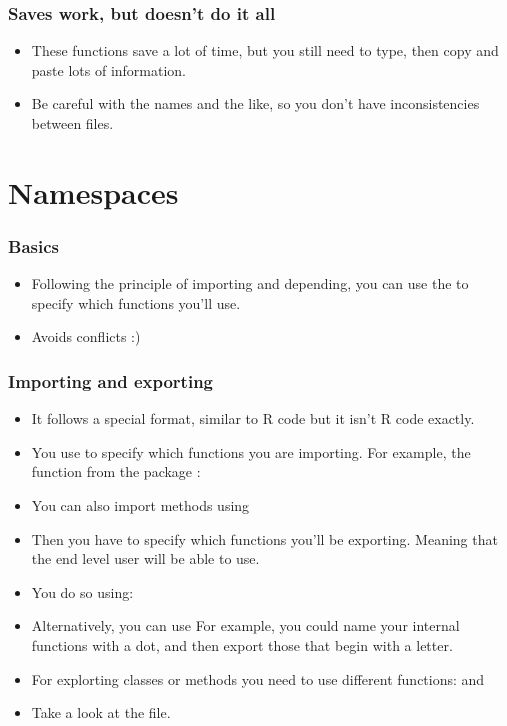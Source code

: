 \begin{frame}[allowframebreaks]
  \frametitle{Saves work, but doesn't do it all}
  \begin{itemize}
  \item These functions save a lot of time, but you still need to type, then copy and paste lots of information.
  \item Be careful with the names and the like, so you don't have inconsistencies between files.
  \end{itemize}
\end{frame}

\section{Namespaces}

\begin{frame}[allowframebreaks]
  \frametitle{Basics}
  \begin{itemize}
  \item Following the principle of importing and depending, you can use the  to specify which functions you'll use.
  \item Avoids conflicts :)
  \end{itemize}
\end{frame}

\begin{frame}[allowframebreaks]
  \frametitle{Importing and exporting}
  \begin{itemize}
  \item It follows a special format, similar to R code but it isn't R code exactly.
  \item You use  to specify which functions you are importing. For example, the function  from the package : \\ 
  \item You can also import methods using 
  \item Then you have to specify which functions you'll be exporting. Meaning that the end level user will be able to use.
  \item You do so using: \\ 
  \item Alternatively, you can use  For example, you could name your internal functions with a dot, and then export those that begin with a letter.
  \item For explorting classes or methods you need to use different functions:  and 
  \item Take a look at the   file.
  \end{itemize}
\end{frame}

